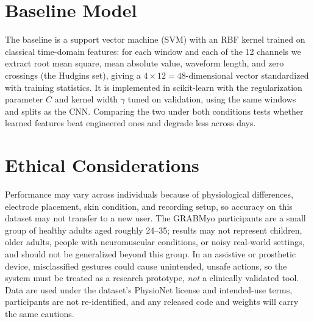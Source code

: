 \documentclass[final]{article}
\begin{document}
\section*{Baseline Model}
The baseline is a support vector machine (SVM) with an RBF kernel trained on classical time-domain features: for each window and each of the 12 channels we extract root mean square, mean absolute value, waveform length, and zero crossings (the Hudgins set), giving a $4\times12=48$-dimensional vector standardized with training statistics. It is implemented in scikit-learn with the regularization parameter $C$ and kernel width $\gamma$ tuned on validation, using the same windows and splits as the CNN. Comparing the two under both conditions tests whether learned features beat engineered ones and degrade less across days.

\section*{Ethical Considerations}
Performance may vary across individuals because of physiological differences, electrode placement, skin condition, and recording setup, so accuracy on this dataset may not transfer to a new user. The GRABMyo participants are a small group of healthy adults aged roughly 24--35; results may not represent children, older adults, people with neuromuscular conditions, or noisy real-world settings, and should not be generalized beyond this group. In an assistive or prosthetic device, misclassified gestures could cause unintended, unsafe actions, so the system must be treated as a research prototype, \emph{not} a clinically validated tool. Data are used under the dataset's PhysioNet license and intended-use terms, participants are not re-identified, and any released code and weights will carry the same cautions.

\newpage


\end{document}
